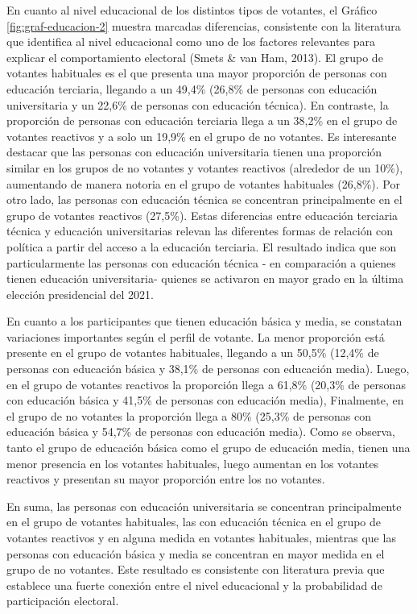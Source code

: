 \documentclass[
  12pt,
]{book}
\begin{document}
En cuanto al nivel educacional de los distintos tipos de votantes, el Gráfico \ref{fig:graf-educacion-2} muestra marcadas diferencias, consistente con la literatura que identifica al nivel educacional como uno de los factores relevantes para explicar el comportamiento electoral (Smets \& van Ham, 2013). El grupo de votantes habituales es el que presenta una mayor proporción de personas con educación terciaria, llegando a un 49,4\% (26,8\% de personas con educación universitaria y un 22,6\% de personas con educación técnica). En contraste, la proporción de personas con educación terciaria llega a un 38,2\% en el grupo de votantes reactivos y a solo un 19,9\% en el grupo de no votantes. Es interesante destacar que las personas con educación universitaria tienen una proporción similar en los grupos de no votantes y votantes reactivos (alrededor de un 10\%), aumentando de manera notoria en el grupo de votantes habituales (26,8\%). Por otro lado, las personas con educación técnica se concentran principalmente en el grupo de votantes reactivos (27,5\%). Estas diferencias entre educación terciaria técnica y educación universitarias relevan las diferentes formas de relación con política a partir del acceso a la educación terciaria. El resultado indica que son particularmente las personas con educación técnica - en comparación a quienes tienen educación universitaria- quienes se activaron en mayor grado en la última elección presidencial del 2021.

En cuanto a los participantes que tienen educación básica y media, se constatan variaciones importantes según el perfil de votante. La menor proporción está presente en el grupo de votantes habituales, llegando a un 50,5\% (12,4\% de personas con educación básica y 38,1\% de personas con educación media). Luego, en el grupo de votantes reactivos la proporción llega a 61,8\% (20,3\% de personas con educación básica y 41,5\% de personas con educación media), Finalmente, en el grupo de no votantes la proporción llega a 80\% (25,3\% de personas con educación básica y 54,7\% de personas con educación media). Como se observa, tanto el grupo de educación básica como el grupo de educación media, tienen una menor presencia en los votantes habituales, luego aumentan en los votantes reactivos y presentan su mayor proporción entre los no votantes.

En suma, las personas con educación universitaria se concentran principalmente en el grupo de votantes habituales, las con educación técnica en el grupo de votantes reactivos y en alguna medida en votantes habituales, mientras que las personas con educación básica y media se concentran en mayor medida en el grupo de no votantes. Este resultado es consistente con literatura previa que establece una fuerte conexión entre el nivel educacional y la probabilidad de participación electoral.
\end{document}
